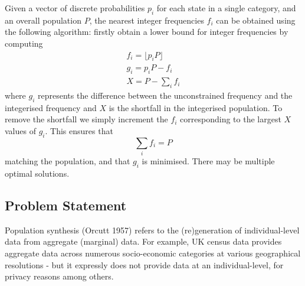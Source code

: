 \documentclass{JASSS}
\begin{document}
Given a vector of discrete probabilities \(p_i\) for each state in a single category, and an overall population \(P\), the nearest integer frequencies \(f_i\) can be obtained using the following algorithm:
firstly obtain a lower bound for integer frequencies by computing
\begin{equation}
\begin{split}
f_i = \lfloor p_{i}P \rfloor \\
g_i = p_i P - f_i \\
X = P - \sum\limits_i{f_i}
\end{split}
\end{equation}
where \(g_i\) represents the difference between the unconstrained frequency and the integerised frequency and \(X\) is the shortfall in the integerised population. To remove the shortfall we simply increment the \(f_i\) corresponding to the largest \(X\) values of \(g_i\). This ensures that
\begin{equation}
\sum\limits_i{f_i} = P 
\end{equation}
matching the population, and that \(g_i\) is minimised. There may be multiple optimal solutions. 

\subsection{Problem Statement}\label{problem-statement}

Population synthesis (Orcutt 1957) refers to the (re)generation of
individual-level data from aggregate (marginal) data. For example, UK
census data provides aggregate data across numerous socio-economic
categories at various geographical resolutions - but it expressly does
not provide data at an individual-level, for privacy reasons among
others.
\end{document}
